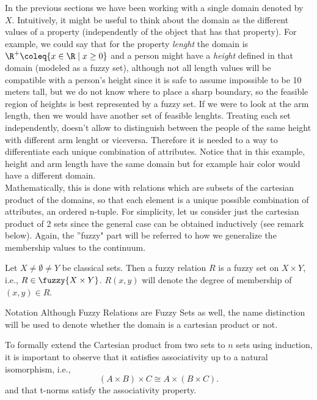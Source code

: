   In the previous sections we have been working with a single domain denoted by $X$. Intuitively, it might be useful to think about the domain as the different values of a property (independently of the object that has that property). For example, we could say that for the property \textit{lenght} the domain is $\R^+\coleq
  \{x\in\R \mid x \geq 0\}$ and a person might have a \textit{height} defined in that domain (modeled as a fuzzy set), although not all length values will be compatible with a person's height since it is safe to assume impossible to be 10 meters tall, but we do not know where to place a sharp boundary, so the feasible region of heights is best represented by a fuzzy set. If we were to look at the arm length, then we would have another set of feasible lenghts. Treating each set independently, doesn't allow to distinguish between the people of the same height with different arm lenght or viceversa. Therefore it is needed to a way to differentiate each unique combination of attributes. Notice that in this example, height and arm length have the same domain but for example hair color would have a different domain.\\

  Mathematically, this is done with relations which are subsets of the cartesian product of the domains, so that each element is a unique possible combination of attributes, an ordered n-tuple. For simplicity, let us consider just the cartesian product of 2 sets since the general case can be obtained inductively (see remark below). Again, the ''fuzzy" part will be referred to how we generalize the membership values to the continuum.


  \begin{definition}
    Let $X\neq \emptyset \neq Y$ be classical sets. Then a fuzzy relation $R$ is a fuzzy set on $X\times Y$, i.e., $R\in \fuzzy{X\times Y}$. $R(x,y)$ will denote the degree of membership of $(x,y) \in R$.
  \end{definition}

  \begin{notation}[label={not:compositionFS}]{Notation}
    Although Fuzzy Relations are Fuzzy Sets as well, the name distinction will be used to denote whether the domain is a cartesian product or not.
  \end{notation}

  \begin{remark}
    To formally extend the Cartesian product from two sets to \( n \) sets using induction, it is important to observe that it satisfies associativity up to a natural isomorphism, i.e., 
    \[
    (A\times B)\times C \cong A\times (B\times C).
    \]
    and that t-norms satisfy the associativity property.
  \end{remark}

